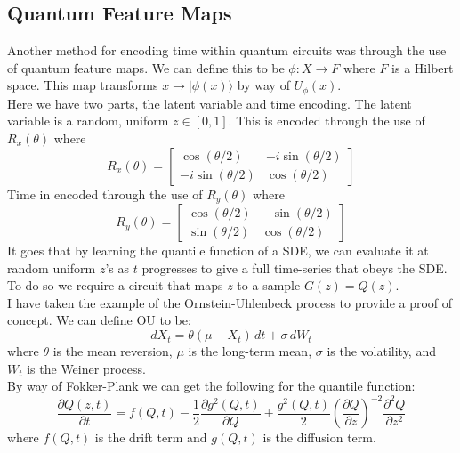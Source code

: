 \documentclass[12pt]{article}
\numberwithin{equation}{section}
\begin{document}
\subsection{Quantum Feature Maps}
Another method for encoding time within quantum circuits was through the use of 
quantum feature maps. We can define this to be $\phi : X \rightarrow F$ where $F$
is a Hilbert space. This map transforms $x \rightarrow |\phi(x)\rangle$ by way 
of $U_\phi(x)$. 
\\ 
Here we have two parts, the latent variable and time encoding. The latent variable 
is a random, uniform $z \in [0,1] $. This is encoded through the use of $R_x(\theta)$ where 
\begin{equation}
R_x(\theta) = 
\begin{bmatrix}
\cos(\theta/2) & -i\sin(\theta/2) \\
-i\sin(\theta/2) & \cos(\theta/2)
\end{bmatrix}
\end{equation}
Time in encoded through the use of $R_y(\theta)$ where 
\begin{equation}
R_y(\theta) = 
\begin{bmatrix}
\cos(\theta/2) & -\sin(\theta/2) \\
\sin(\theta/2) & \cos(\theta/2)
\end{bmatrix}
\end{equation}
It goes that by learning the quantile function of a SDE, we can evaluate it at 
random uniform $z$'s as $t$ progresses to give a full time-series that obeys the 
SDE. To do so we require a circuit that maps $z$ to a sample $G(z) = Q(z)$. \\ 
I have taken the example of the Ornstein-Uhlenbeck process to provide a proof of 
concept. We can define OU to be: 
\begin{equation}
  dX_t = \theta (\mu - X_t) \, dt + \sigma \, dW_t 
\end{equation}
where $\theta$ is the mean reversion, $\mu$ is the long-term mean, $\sigma$ is the 
volatility, and $W_t$ is the Weiner process. 
\\
By way of Fokker-Plank we can get the following for the quantile function:
\begin{equation}
  \frac{\partial Q(z,t)}{\partial t} = f(Q,t) - \frac{1}{2}\frac{\partial g^2(Q,t)}
{\partial Q} + \frac{g^2(Q,t)}{2}(\frac{\partial Q}{\partial z})^{-2}
  \frac{\partial ^2Q}{\partial z^2}
\end{equation}
where $f(Q,t)$ is the drift term and $g(Q,t)$ is the diffusion term. 
\end{document}
